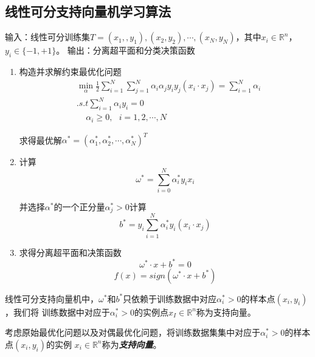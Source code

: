 \subsection*{线性可分支持向量机学习算法}

输入：线性可分训练集$T={(x_1,,y_1),(x_2,y_2),\cdots,(x_N,y_N)}$，其中$x_i\in \mathbb{R}^n$，$y_i\in \{-1,+1\}$。
输出：分离超平面和分类决策函数

\begin{enumerate}
    \item 构造并求解约束最优化问题
    \begin{equation}
        \begin{aligned}
            & \min\limits_{\alpha} \frac{1}{2}\sum\limits_{i=1}^{N}\sum\limits_{j=1}^{N}
            \alpha_i\alpha_jy_iy_j(x_i\cdot x_j)=\sum\limits_{i=1}^{N}\alpha_i\\
            &.s.t \sum\limits_{i=1}^{N}\alpha_iy_i=0\\
            & \ \ \ \ \ \alpha_i\geqslant 0,\ \ \ i=1,2,\cdots,N
        \end{aligned}
    \end{equation}
    
    求得最优解$\alpha^*=(\alpha^*_1,\alpha^*_2,\cdots,\alpha^*_N)^T$
    \item 计算
    \begin{equation}
        \omega^*=\sum\limits_{i=0}^{N} \alpha^*_i y_i x_i
    \end{equation}

    并选择$\alpha^*$的一个正分量$\alpha^*_j>0$计算
    \begin{equation}
        b^*=y_i\sum\limits_{i=1}^{N}\alpha^*_iy_i(x_i\cdot x_j)
    \end{equation}
    \item 求得分离超平面和决策函数
    \begin{equation}
        \omega^*\cdot x+b^*=0
    \end{equation}
    \begin{equation}
        f(x)=sign(\omega^*\cdot x+b^*)
    \end{equation}
\end{enumerate}



线性可分支持向量机中，$\omega^*$和$b^*$只依赖于训练数据中对应$\alpha^*_i>0$的样本点$(x_i,y_i)$，我们将
训练数据中对应于$\alpha^*_i>0$的实例点$x_I\in \mathbb{R}^n$称为支持向量。

\begin{define}[支持向量]
    考虑原始最优化问题以及对偶最优化问题，将训练数据集集中对应于$\alpha^*_i>0$的样本点$(x_i,y_i)$的实例
    $x_i\in \mathbb{R}^n$称为\textsl{\textbf{支持向量}}。
\end{define}